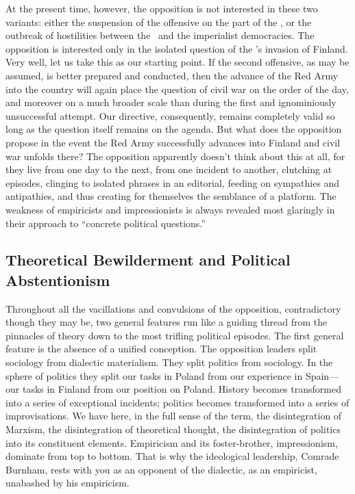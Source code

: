 At the present time, however, the opposition is not interested in these two variants: either the suspension of the offensive on the part of the \USSR, or the outbreak of hostilities between the \USSR\ and the imperialist democracies. The opposition is interested only in the isolated question of the \USSR’s invasion of Finland. Very well, let us take this as our starting point. If the second offensive, as may be assumed, is better prepared and conducted, then the advance of the Red Army into the country will again place the question of civil war on the order of the day, and moreover on a much broader scale than during the first and ignominiously unsuccessful attempt. Our directive, consequently, remains completely valid so long as the question itself remains on the agenda. But what does the opposition propose in the event the Red Army successfully advances into Finland and civil war unfolds there? The opposition apparently doesn’t think about this at all, for they live from one day to the next, from one incident to another, clutching at episodes, clinging to isolated phrases in an editorial, feeding on sympathies and antipathies, and thus creating for themselves the semblance of a platform. The weakness of empiricists and impressionists is always revealed most glaringly in their approach to “concrete political questions.”
\noclub

\subsection*{Theoretical Bewilderment and Political Abstentionism}

Throughout all the vacillations and convulsions of the opposition, contradictory though they may be, two general features run like a guiding thread from the pinnacles of theory down to the most trifling political episodes. The first general feature is the absence of a unified conception. The opposition leaders split sociology from dialectic materialism. They split politics from sociology. In the sphere of politics they split our tasks in Poland from our experience in Spain---our tasks in Finland from our position on Poland. History becomes transformed into a series of exceptional incidents; politics becomes transformed into a series of improvisations. We have here, in the full sense of the term, the disintegration of Marxism, the disintegration of theoretical thought, the disintegration of politics into its constituent elements. Empiricism and its foster-brother, impressionism, dominate from top to bottom. That is why the ideological leadership, Comrade Burnham, rests with you as an opponent of the dialectic, as an empiricist, unabashed by his empiricism.

